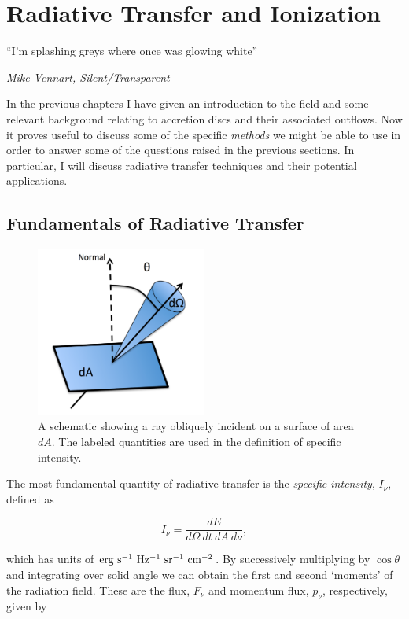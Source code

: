 \chapter{Radiative Transfer and Ionization}

\epigraph{``I'm splashing greys where once was glowing white''}{{\sl Mike Vennart, Silent/Transparent}}

In the previous chapters I have given an introduction to the field and 
some relevant background relating to accretion 
discs and their associated outflows. Now it proves useful
to discuss some of the specific {\em methods} we might be able to use
in order to answer some of the questions raised in the previous sections.
In particular, I will discuss radiative transfer techniques and 
their potential applications.

\section{Fundamentals of Radiative Transfer}

\begin{figure}
\centering
\includegraphics[width=0.5\textwidth]{figures/03-radtrans/rays_schematic.png}
\caption
{
A schematic showing a ray obliquely incident on a surface of area $dA$.
The labeled quantities are used in the definition of specific intensity.
} 
\label{fig:ray}
\end{figure}


The most fundamental quantity of radiative transfer is the 
{\em specific intensity}, $I_\nu$, defined as

\begin{equation}
I_\nu = \frac{dE}{d\Omega~dt~dA~d\nu},
\end{equation}

which has units of ${\rm erg~s^{-1}~Hz^{-1}~sr^{-1}~cm^{-2}}$.
By successively multiplying by $\cos \theta$ and integrating over solid angle we 
can obtain the first and second `moments' of the radiation field. These
are the flux, $F_\nu$ and momentum flux, $p_\nu$, respectively, given by

